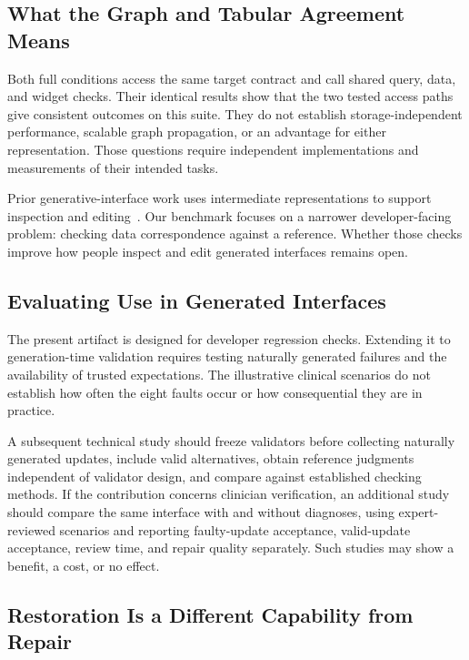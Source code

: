\documentclass[manuscript,review,anonymous]{acmart}
\begin{document}
\subsection{What the Graph and Tabular Agreement Means}

Both full conditions access the same target contract and call shared query, data, and widget checks. Their identical results show that the two tested access paths give consistent outcomes on this suite. They do not establish storage-independent performance, scalable graph propagation, or an advantage for either representation. Those questions require independent implementations and measurements of their intended tasks.

Prior generative-interface work uses intermediate representations to support inspection and editing~\cite{cao2025jelly,park2026bridging,kaputa2026simstep}. Our benchmark focuses on a narrower developer-facing problem: checking data correspondence against a reference. Whether those checks improve how people inspect and edit generated interfaces remains open.

\subsection{Evaluating Use in Generated Interfaces}

The present artifact is designed for developer regression checks. Extending it to generation-time validation requires testing naturally generated failures and the availability of trusted expectations. The illustrative clinical scenarios do not establish how often the eight faults occur or how consequential they are in practice.

A subsequent technical study should freeze validators before collecting naturally generated updates, include valid alternatives, obtain reference judgments independent of validator design, and compare against established checking methods. If the contribution concerns clinician verification, an additional study should compare the same interface with and without diagnoses, using expert-reviewed scenarios and reporting faulty-update acceptance, valid-update acceptance, review time, and repair quality separately. Such studies may show a benefit, a cost, or no effect.

\subsection{Restoration Is a Different Capability from Repair}
\end{document}
